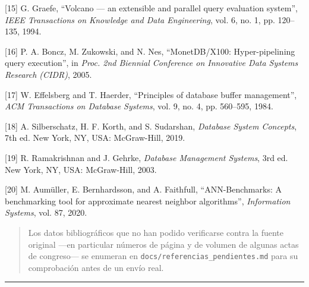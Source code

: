 \documentclass[11pt,a4paper]{article}
\begin{document}
{[}15{]} G. Graefe, \enquote{Volcano --- an extensible and parallel query
evaluation system}, \emph{IEEE Transactions on Knowledge and Data
Engineering}, vol. 6, no. 1, pp. 120--135, 1994.

{[}16{]} P. A. Boncz, M. Zukowski, and N. Nes, \enquote{MonetDB/X100:
Hyper-pipelining query execution}, in \emph{Proc. 2nd Biennial
Conference on Innovative Data Systems Research (CIDR)}, 2005.

{[}17{]} W. Effelsberg and T. Haerder, \enquote{Principles of database buffer
management}, \emph{ACM Transactions on Database Systems}, vol. 9, no. 4,
pp. 560--595, 1984.

{[}18{]} A. Silberschatz, H. F. Korth, and S. Sudarshan, \emph{Database
System Concepts}, 7th ed. New York, NY, USA: McGraw-Hill, 2019.

{[}19{]} R. Ramakrishnan and J. Gehrke, \emph{Database Management
Systems}, 3rd ed. New York, NY, USA: McGraw-Hill, 2003.

{[}20{]} M. Aumüller, E. Bernhardsson, and A. Faithfull,
\enquote{ANN-Benchmarks: A benchmarking tool for approximate nearest neighbor
algorithms}, \emph{Information Systems}, vol. 87, 2020.

\begin{quote}
Los datos bibliográficos que no han podido verificarse contra la fuente
original ---en particular números de página y de volumen de algunas
actas de congreso--- se enumeran en
\texttt{docs/referencias\_pendientes.md} para su comprobación antes de
un envío real.
\end{quote}

\begin{center}\rule{0.5\linewidth}{0.5pt}\end{center}
\end{document}
